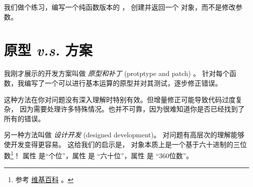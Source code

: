 {


我们做个练习，编写一个纯函数版本的   ，
创建并返回一个  对象，而不是修改参数。


\section{原型 {\em v.s.} 方案}

\label{prototype}
  
  


我刚才展示的开发方案叫做 {\em 原型和补丁} (protptype and patch) 。
针对每个函数，我编写了一个可以进行基本运算的原型并对其测试，逐步修正错误。


这种方法在你对问题没有深入理解时特别有效。但增量修正可能导致代码过度复杂，
因为需要处理许多特殊情况。也并不可靠，因为很难知道你是否已经找到了所有的错误。


另一种方法叫做 {\em 设计开发} (designed development)。
对问题有高层次的理解能够使开发变得更容易。
这给我们的启示是， 对象本质上是一个基于六十进制的三位数\footnote{参考 \href{http://en.wikipedia.org/wiki/Sexagesimal}{维基百科} 。}！
属性  是``个位''，属性  是 ``六十位''，属性  是 ``360位数''。

}
